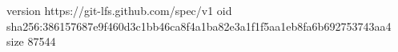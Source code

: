 version https://git-lfs.github.com/spec/v1
oid sha256:386157687e9f460d3c1bb46ca8f4a1ba82e3a1f1f5aa1eb8fa6b692753743aa4
size 87544
